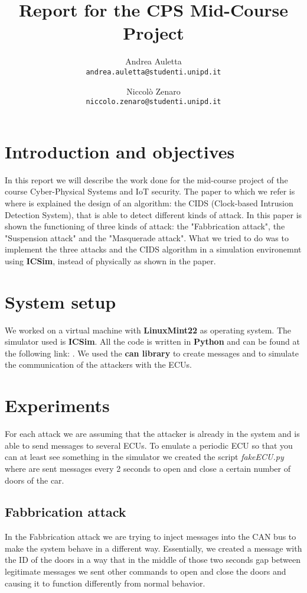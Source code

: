 \documentclass[12pt]{article}
\title{Report for the CPS Mid-Course Project}
\author{
    Andrea Auletta \\ \texttt{andrea.auletta@studenti.unipd.it} \and
    Niccolò Zenaro \\ \texttt{niccolo.zenaro@studenti.unipd.it}
}
\begin{document}
\maketitle
\newpage
\tableofcontents
\newpage

\section{Introduction and objectives}
In this report we will describe the work done for the mid-course project of the course 
Cyber-Physical Systems and IoT security. 
The paper to which we refer is \textbf{\cite{Cho2016} } where is explained 
the design of an algorithm: the CIDS (Clock-based Intrusion Detection System), that is able 
to detect different kinds of attack. In this paper is shown the functioning of three kinds 
of attack: the "Fabbrication attack", the "Suspension attack" and the "Masquerade attack". 
What we tried to do was to implement the three attacks and the CIDS algorithm in a simulation 
environemnt using \textbf{ICSim}, instead of physically as shown in the paper.
\section{System setup}
We worked on a virtual machine with \textbf{LinuxMint22} as operating system.
The simulator used is \textbf{ICSim}. All the code is written in \textbf{Python} and can 
be found at the following link: .%
We used the \textbf{can library} to create messages and to simulate the communication of the attackers with 
the ECUs.
\section{Experiments}
For each attack we are assuming that the attacker is already in the system and is able to send messages to 
several ECUs. To emulate a periodic ECU so that you can at least see something in the simulator we created 
the script \textit{fakeECU.py} where are sent messages every 2 seconds to open and close a certain number of 
doors of the car.  
\subsection{Fabbrication attack}
In the Fabbrication attack we are trying to inject messages into the CAN bus to make the system behave in a 
different way. Essentially, we created a message with the ID of the doors in a way that in the middle of 
those two seconds gap between legitimate messages we sent other commands to open and close the doors and 
causing it to function differently from normal behavior.
\end{document}
